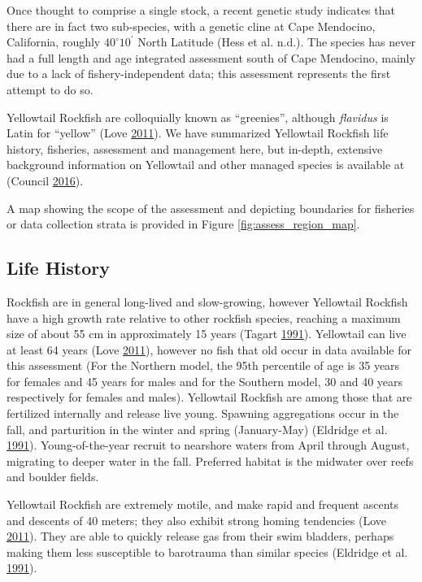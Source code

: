 \documentclass[12pt,]{article}
\begin{document}
Once thought to comprise a single stock, a recent genetic study
indicates that there are in fact two sub-species, with a genetic cline
at Cape Mendocino, California, roughly \(40^\circ 10^\prime\) North
Latitude (Hess et al. n.d.). The species has never had a full length and
age integrated assessment south of Cape Mendocino, mainly due to a lack
of fishery-independent data; this assessment represents the first
attempt to do so.

Yellowtail Rockfish are colloquially known as ``greenies'', although
\emph{flavidus} is Latin for ``yellow'' (Love
\protect\hyperlink{ref-Love2011}{2011}). We have summarized Yellowtail
Rockfish life history, fisheries, assessment and management here, but
in-depth, extensive background information on Yellowtail and other
managed species is available at (Council
\protect\hyperlink{ref-PFMC2016}{2016}).

A map showing the scope of the assessment and depicting boundaries for
fisheries or data collection strata is provided in Figure
\ref{fig:assess_region_map}.

\subsection{Life History}\label{life-history}

Rockfish are in general long-lived and slow-growing, however Yellowtail
Rockfish have a high growth rate relative to other rockfish species,
reaching a maximum size of about 55 cm in approximately 15 years (Tagart
\protect\hyperlink{ref-Tagart1991}{1991}). Yellowtail can live at least
64 years (Love \protect\hyperlink{ref-Love2011}{2011}), however no fish
that old occur in data available for this assessment (For the Northern
model, the 95th percentile of age is 35 years for females and 45 years
for males and for the Southern model, 30 and 40 years respectively for
females and males). Yellowtail Rockfish are among those that are
fertilized internally and release live young. Spawning aggregations
occur in the fall, and parturition in the winter and spring
(January-May) (Eldridge et al.
\protect\hyperlink{ref-Eldridge1991}{1991}). Young-of-the-year recruit
to nearshore waters from April through August, migrating to deeper water
in the fall. Preferred habitat is the midwater over reefs and boulder
fields.

Yellowtail Rockfish are extremely motile, and make rapid and frequent
ascents and descents of 40 meters; they also exhibit strong homing
tendencies (Love \protect\hyperlink{ref-Love2011}{2011}). They are able
to quickly release gas from their swim bladders, perhaps making them
less susceptible to barotrauma than similar species (Eldridge et al.
\protect\hyperlink{ref-Eldridge1991}{1991}).
\end{document}
